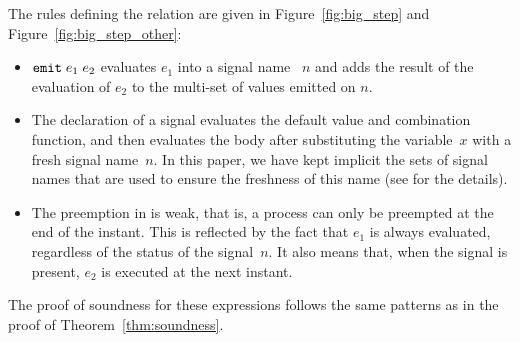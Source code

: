 \documentclass[9pt,preprint]{sigplanconf}
\begin{document}
The rules defining the relation are given in Figure~\ref{fig:big_step} and Figure~\ref{fig:big_step_other}:
\begin{itemize}
\item $\mathtt{emit}\; e_1\; e_2$ evaluates $e_1$ into a signal name~ $n$ and adds the result of the evaluation of $e_2$ to the multi-set of values emitted on $n$.
\item The declaration of a signal evaluates the default value and combination function, and then evaluates the body after substituting the variable~$x$ with a fresh signal name~$n$. In this paper, we have kept implicit the sets of signal names that are used to ensure the freshness of this name (see \cite{Mandel:2005} for the details).
\item The preemption in \rml is weak, that is, a process can only be preempted at the end of the instant. This is reflected by the fact that $e_1$ is always evaluated, regardless of the status of the signal~$n$. It also means that, when the signal is present, $e_2$ is executed at the next instant.
\end{itemize}

The proof of soundness for these expressions follows the same patterns as in the proof of Theorem~\ref{thm:soundness}.
\end{document}
